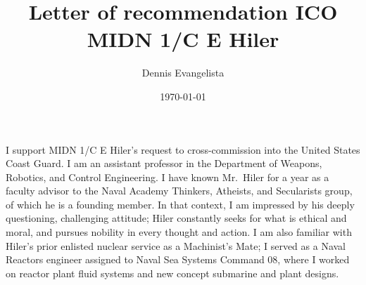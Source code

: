 \documentclass[10pt,courier]{navymemo}
\author{Dennis Evangelista}
\title{Letter of recommendation ICO MIDN 1/C E Hiler}
\date{\today}
\begin{document}
\makedateblock{}

\MEMORANDUM{}

\begin{navyletterheader}
\navyskip{}%
\navysubjline{}%
\end{navyletterheader}





\section{} 
I support MIDN 1/C E Hiler's request to cross-commission into the United States Coast Guard. I am an assistant professor in the Department of Weapons, Robotics, and Control Engineering. I have known Mr.~Hiler for a year as a faculty advisor to the Naval Academy Thinkers, Atheists, and Secularists group, of which he is a founding member. In that context, I am impressed by his deeply questioning, challenging attitude; Hiler constantly seeks for what is ethical and moral, and pursues nobility in every thought and action. I am also familiar with Hiler's prior enlisted nuclear service as a Machinist's Mate; I served as a Naval Reactors engineer assigned to Naval Sea Systems Command 08, where I worked on reactor plant fluid systems and new concept submarine and plant designs. 
\end{document}

